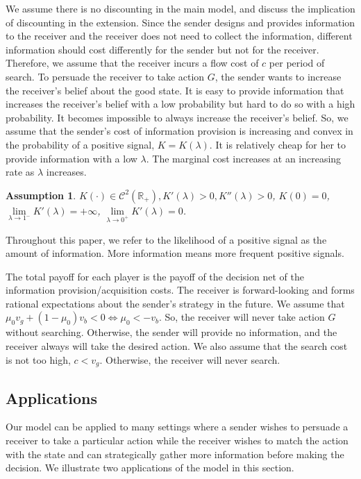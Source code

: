 \documentclass[11pt]{extarticle}
\newtheorem{as}{Assumption}
\newcommand{\lra}{\Leftrightarrow}
\begin{document}
We assume there is no discounting in the main model, and discuss the implication of discounting in the extension. Since the sender designs and provides information to the receiver and the receiver does not need to collect the information, different information should cost differently for the sender but not for the receiver. Therefore, we assume that the receiver incurs a flow cost of $c$ per period of search. To persuade the receiver to take action $G$, the sender wants to increase the receiver's belief about the good state. It is easy to provide information that increases the receiver's belief with a low probability but hard to do so with a high probability. It becomes impossible to always increase the receiver's belief. So, we assume that the sender's cost of information provision is increasing and convex in the probability of a positive signal, $K = K(\lambda)$. It is relatively cheap for her to provide information with a low $\lambda$. The marginal cost increases at an increasing rate as $\lambda$ increases. 

\begin{as}\label{assumption_sender_cost}
	$K(\cdot) \in \mathcal{C}^2(\mathbb{R_+}),K'(\lambda)>0,K''(\lambda)>0$, $K(0) = 0$, $\lim\limits_{\lambda \rightarrow 1^-} K'(\lambda)=+\infty$, $\lim\limits_{\lambda \rightarrow 0^+} K'(\lambda)=0$.
\end{as}

Throughout this paper, we refer to the likelihood of a positive signal as the amount of information. More information means more frequent positive signals.

The total payoff for each player is the payoff of the decision net of the information provision/acquisition costs. The receiver is forward-looking and forms rational expectations about the sender's strategy in the future. We assume that $\mu_0 v_g + (1-\mu_0) v_b < 0 \lra \mu_0 < -v_b$. So, the receiver will never take action $G$ without searching. Otherwise, the sender will provide no information, and the receiver always will take the desired action. We also assume that the search cost is not too high, $c < v_g$. Otherwise, the receiver will never search.


\subsection{Applications}
Our model can be applied to many settings where a sender wishes to persuade a receiver to take a particular action while the receiver wishes to match the action with the state and can strategically gather more information before making the decision. We illustrate two applications of the model in this section.
\end{document}
